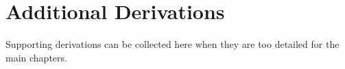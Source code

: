 \chapter{Additional Derivations}

Supporting derivations can be collected here when they are too detailed for the
main chapters.

